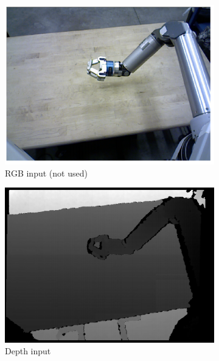 \begin{figure}[ht]
	\centering
	\begin{subfigure}{0.45\textwidth}
		\includegraphics[width=1.0\textwidth]{img/dense_tracking/rgb_input}
		\caption{RGB input (not used)}
	\end{subfigure}
	\begin{subfigure}{0.45\textwidth}
		\includegraphics[width=1.0\textwidth]{img/dense_tracking/depth_input}
		\caption{Depth input}
	\end{subfigure}
	\begin{subfigure}{0.45\textwidth}

\end{subfigure}
\end{figure}
